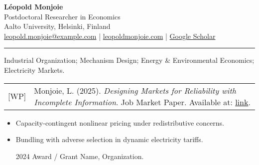 \documentclass[11pt,a4paper]{article}
\begin{document}
{\Large \textbf{L\'eopold Monjoie}}\\[2pt]
Postdoctoral Researcher in Economics\\
Aalto University, Helsinki, Finland\\
\href{mailto:leopold.monjoie@example.com}{leopold.monjoie@example.com} \;|\; \href{https://leopoldmonjoie.com}{leopoldmonjoie.com} \;|\; \href{https://scholar.google.com/}{Google Scholar}

\vspace{0.6em}\hrule\vspace{0.8em}

Industrial Organization; Mechanism Design; Energy & Environmental Economics; Electricity Markets.



\begin{longtable}{@{}p{1cm}p{14cm}@{}}
[WP] & Monjoie, L. (2025). \emph{Designing Markets for Reliability with Incomplete Information}. Job Market Paper. Available at: \href{https://leopoldmonjoie.com/files/monjoie_jmp.pdf}{link}. \\
\end{longtable}

\begin{itemize}
  \item Capacity-contingent nonlinear pricing under redistributive concerns.
  \item Bundling with adverse selection in dynamic electricity tariffs.
\end{itemize}

\begin{itemize}
  \item [2024] Award / Grant Name, Organization.
\end{itemize}
\end{document}

